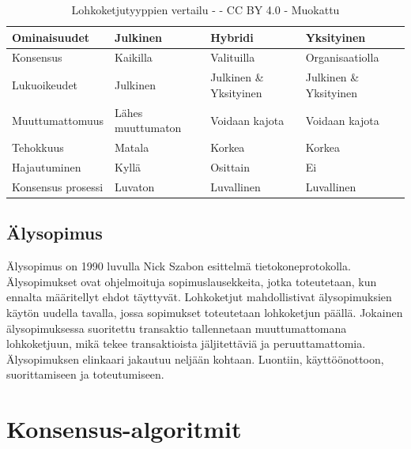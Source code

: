 \documentclass[utf8,bachelor]{gradu3}
\begin{document}
\begin{table}[ht]\centering
  \begin{tabular}{llll}
    \toprule
    Ominaisuudet & Julkinen & Hybridi & Yksityinen \\
    \midrule
    Konsensus & Kaikilla & Valituilla & Organisaatiolla \\
    Lukuoikeudet & Julkinen & Julkinen \& Yksityinen & Julkinen \& Yksityinen \\
    Muuttumattomuus & Lähes muuttumaton & Voidaan kajota & Voidaan kajota \\
    Tehokkuus & Matala & Korkea & Korkea \\
    Hajautuminen & Kyllä & Osittain & Ei \\
    Konsensus prosessi & Luvaton & Luvallinen & Luvallinen \\
    \bottomrule
  \end{tabular}
  \caption{Lohkoketjutyyppien vertailu - \cite{zarrin2021blockchain} - CC BY 4.0 - Muokattu}
  \label{tbl:cmdchange}
\end{table}

\section{Älysopimus}
Älysopimus on 1990 luvulla Nick Szabon esittelmä tietokoneprotokolla. Älysopimukset ovat ohjelmoituja sopimuslausekkeita, jotka toteutetaan, kun ennalta määritellyt ehdot täyttyvät.
Lohkoketjut mahdollistivat älysopimuksien käytön uudella tavalla, jossa sopimukset toteutetaan lohkoketjun päällä.
Jokainen älysopimuksessa suoritettu transaktio tallennetaan muuttumattomana lohkoketjuun, mikä tekee transaktioista jäljitettäviä ja peruuttamattomia. 
Älysopimuksen elinkaari jakautuu neljään kohtaan. Luontiin, käyttöönottoon, suorittamiseen ja toteutumiseen.

\chapter{Konsensus-algoritmit}\label{Konsensus}
\end{document}
